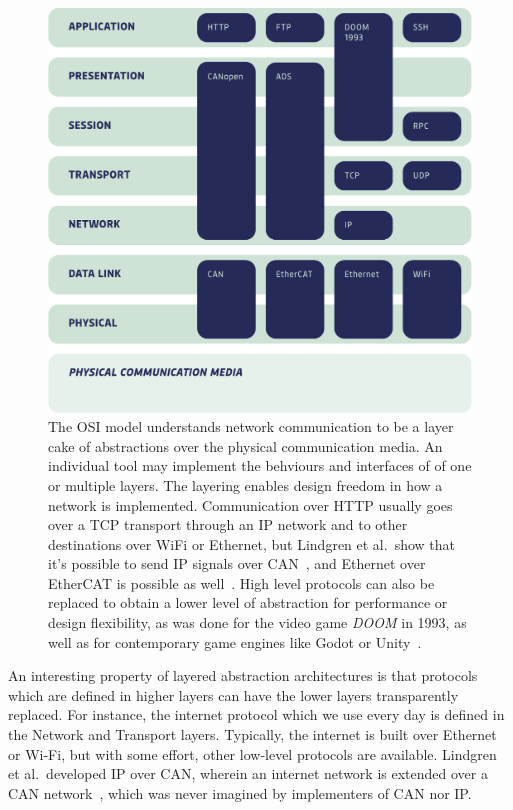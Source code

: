 \documentclass[english,12pt,a4paper,pdftex,eng,utf8]{aaltothesis}
\begin{document}
\begin{figure}[h]
  \centering
  \includegraphics[width=\textwidth]{assets/osi_model}
  \caption{The OSI model understands network communication to be a layer cake of abstractions over the physical communication media.  An individual tool may implement the behviours and interfaces of of one or multiple layers.  The layering enables design freedom in how a network is implemented.  Communication over HTTP usually goes over a TCP transport through an IP network and to other destinations over WiFi or Ethernet, but Lindgren et al.\ show that it's possible to send IP signals over CAN~\cite{Lindgren2008}, and Ethernet over EtherCAT is possible as well~\cite[§1.9.3]{EtherCATFieldbus}.  High level protocols can also be replaced to obtain a lower level of abstraction for performance or design flexibility, as was done for the video game \emph{DOOM} in 1993, as well as for contemporary game engines like Godot or Unity~\cite{DOOM1993,GodotMultiplayer,UnityTransport}.}\label{fig:osi_model}
\end{figure}

An interesting property of layered abstraction architectures is that protocols which are defined in higher layers can have the lower layers transparently replaced. For instance, the internet protocol which we use every day is defined in the Network and Transport layers. Typically, the internet is built over Ethernet or Wi-Fi, but with some effort, other low-level protocols are available. Lindgren et al.\ developed IP over CAN, wherein an internet network is extended over a CAN network~\cite{Lindgren2008}, which was never imagined by implementers of CAN nor IP.
\end{document}
